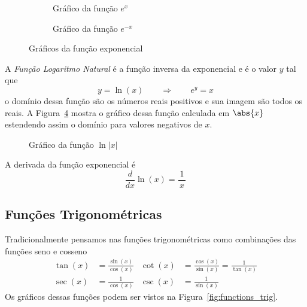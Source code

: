 \begin{figure}[t]
  \centering
  \begin{subfigure}[b]{0.5\linewidth}
    \centering
    
    \caption{Gráfico da função $e^{x}$}
    \label{fig:functions_exp_positiva}
  \end{subfigure}%
  \begin{subfigure}[b]{0.5\linewidth}
    \centering
    
    \caption{Gráfico da função $e^{-x}$}
    \label{fig:functions_exp_negativa}
  \end{subfigure}
  \caption{Gráficos da função exponencial}
  \label{fig:functions_exp}
\end{figure}

A \emph{Função Logaritmo Natural}
é a função inversa da exponencial e é o valor $y$ tal que
\[
  y = \ln(x) \qquad\Rightarrow\qquad e^y = x
\]
o domínio dessa função são os números reais positivos e sua imagem são todos os reais.
A Figura~\ref{fig:functions_log} mostra o gráfico dessa função calculada em
$\abs{x}$ estendendo assim o domínio para valores negativos de $x$.


\begin{figure}
  \centering
  
  \caption{Gráfico da função $\ln|x|$}
  \label{fig:functions_log}
\end{figure}

A derivada da função exponencial é
\[
  \frac{d}{dx} \ln(x) = \frac{1}{\,x\,}
\]

\subsection*{Funções Trigonométricas}

Tradicionalmente pensamos nas funções trigonométricas como combinações
das funções seno e cosseno
\begin{align*}
	\tan(x) & = \frac{\sin(x)}{\cos(x)} &
	\cot(x) & = \frac{\cos(x)}{\sin(x)} = \frac{1}{\tan(x)}\\[5mm]
	\sec(x) & = \frac{1}{\cos(x)}       &
	\csc(x) & = \frac{1}{\sin(x)}
\end{align*}
Os gráficos dessas funções podem ser vistos na Figura~\ref{fig:functions_trig}.

